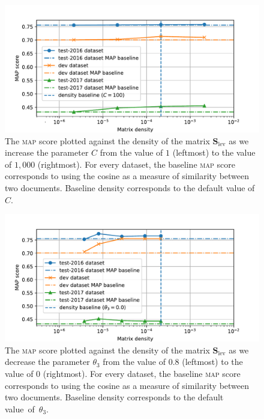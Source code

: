 \documentclass[
  digital, %
  notable, %
  lof,     %
  lot,     %
  nopalatino, color
]{fithesis3}
\def\abbr#1{\textsc{\MakeLowercase{#1}}}
\begin{document}
\begin{figure}[p]
\centering%
\includegraphics[trim={0.6cm 0.1cm 1.5cm 1.0cm}, scale=0.75]{figs/fig4}
\caption[A \abbr{MAP}-density plot for matrix $\mathbf S_{\textrm{lev}}$
and parameter $C$]{The \abbr{MAP}\index{map@\protect\abbr{MAP}}
  score plotted against the density of the matrix $\mathbf S_{\textrm{lev}}$
   as we increase the parameter $C$
   from the value of $1$ (leftmost) to the value of $1{,}000$
  (rightmost). For every dataset, the baseline \abbr{MAP} score
  corresponds to using the cosine as a measure of similarity between two
  documents. Baseline density corresponds to the default value of~$C$.}
  \label{fig:similarity-fig4}
\end{figure}

\begin{figure}[p]
\centering%
\includegraphics[trim={0.6cm 0.1cm 1.5cm 1.0cm}, scale=0.75]{figs/fig5}
\caption[A \abbr{MAP}-density plot for matrix $\mathbf S_{\textrm{lev}}$
and parameter $\theta_3$]{The
  \abbr{MAP}\index{map@\protect\abbr{MAP}} score plotted against the density of
  the matrix $\mathbf S_{\textrm{lev}}$ 
  as we decrease the parameter $\theta_3$ from
  the value of $0.8$ (leftmost) to the value of $0$ (rightmost). For every
  dataset, the baseline \abbr{MAP} score corresponds to using the cosine as a measure
  of similarity between two documents. Baseline density corresponds to the
  default value~of~$\theta_3$.}
  \label{fig:similarity-fig5}
\end{figure}
\end{document}
